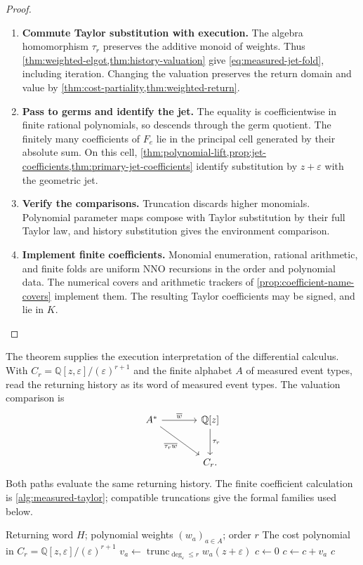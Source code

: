 \documentclass[11pt,a4paper]{article}
\numberwithin{algorithm}{section}
\numberwithin{equation}{section}
\theoremstyle{definition}
\theoremstyle{remark}
\theoremstyle{plain}
\newcommand{\QQ}{\mathbb Q}
\newcommand{\eps}{\varepsilon}
\theoremstyle{definition}
\theoremstyle{plain}
\begin{document}
\begin{proof}\leavevmode
\begin{enumerate}[leftmargin=*,align=left]
\item \textbf{Commute Taylor substitution with execution.}
The algebra homomorphism $\tau_r$ preserves the additive monoid
of weights. Thus \cref{thm:weighted-elgot,thm:history-valuation}
give \eqref{eq:measured-jet-fold}, including iteration.
Changing the valuation preserves the return domain and value by
\cref{thm:cost-partiality,thm:weighted-return}.

\item \textbf{Pass to germs and identify the jet.}
The equality is coefficientwise in finite rational polynomials,
so descends through the germ quotient. The finitely many
coefficients of $F_e$ lie in the principal cell generated by
their absolute sum. On this cell,
\cref{thm:polynomial-lift,prop:jet-coefficients,thm:primary-jet-coefficients}
identify substitution by $z+\eps$ with the geometric jet.

\item \textbf{Verify the comparisons.}
Truncation discards higher monomials. Polynomial parameter maps
compose with Taylor substitution by their full Taylor law, and
history substitution gives the environment comparison.

\item \textbf{Implement finite coefficients.}
Monomial enumeration, rational arithmetic, and finite folds are
uniform NNO recursions in the order and polynomial data.
The numerical covers and arithmetic trackers of
\cref{prop:coefficient-name-covers} implement them.
The resulting Taylor coefficients may be signed, and lie in $K$.
\end{enumerate}
\end{proof}

The theorem supplies the execution interpretation of the differential
calculus. With $C_r=\QQ[z,\eps]/(\eps)^{r+1}$ and the finite
alphabet $A$ of measured event types, read the returning history as
its word of measured event types. The valuation comparison is
\[
\begin{tikzcd}[column sep=large,row sep=large]
 A^* \arrow[r,"{\overline w}"]
     \arrow[dr,"{\overline{\tau_rw}}"']
   & \QQ[z] \arrow[d,"{\tau_r}"]\\
   & C_r .
\end{tikzcd}
\]
Both paths evaluate the same returning history. The finite coefficient
calculation is \cref{alg:measured-taylor}; compatible truncations
give the formal families used below.
\begin{algorithm}[H]
\caption{Measured Taylor coefficients on a returning history}\label{alg:measured-taylor}
\small
\begin{algorithmic}[1]
\Require Returning word $H$; polynomial weights $(w_a)_{a\in A}$; order $r$
\Ensure The cost polynomial in $C_r=\QQ[z,\eps]/(\eps)^{r+1}$
  \State $v_a\gets\operatorname{trunc}_{\deg_\eps\le r}w_a(z+\eps)$
\EndFor
\State $c\gets0$
  \State $c\gets c+v_a$
\EndFor
\State \Return $c$
\end{algorithmic}
\end{algorithm}
\end{document}
